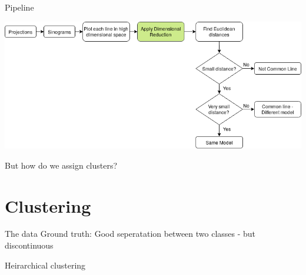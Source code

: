 \documentclass[t, 11pt, xcolor=dvipsnames]{beamer}
\begin{document}
\begin{frame}[fragile]{Pipeline}
  \begin{center}\includegraphics[width=1\textwidth]{images/second_pipeline.png}
    \end{center}

    \pause
    But how do we assign clusters?
\end{frame}

\section{Clustering}
\begin{frame}{The data}
  Ground truth: Good seperatation between two classes - but discontinuous

\end{frame}

\begin{frame}{Heirarchical clustering}
\end{frame}
\end{document}
